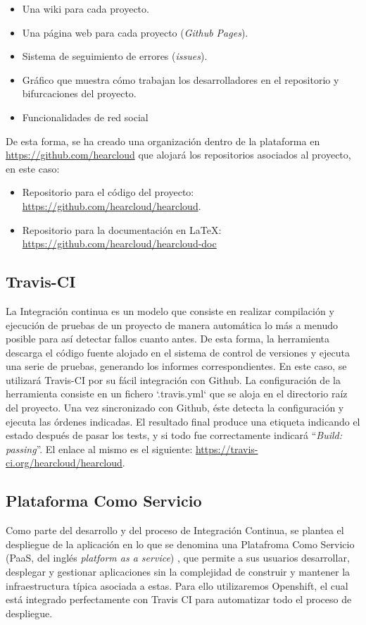 \begin{itemize}
	\item Una wiki para cada proyecto.
	\item Una página web para cada proyecto (\textit{Github Pages}).
	\item Sistema de seguimiento de errores (\textit{issues}).
	\item Gráfico que muestra cómo trabajan los desarrolladores en el repositorio y bifurcaciones del proyecto.
	\item Funcionalidades de red social
\end{itemize}

De esta forma, se ha creado una organización dentro de la plataforma en \url{https://github.com/hearcloud} que alojará los repositorios asociados al proyecto, en este caso:

\begin{itemize}
	\item Repositorio para el código del proyecto: \url{https://github.com/hearcloud/hearcloud}.
	\item Repositorio para la documentación en {\LaTeX\xspace}: \url{https://github.com/hearcloud/hearcloud-doc}
\end{itemize}

\subsection{Travis-CI}
La Integración continua es un modelo que consiste en realizar compilación y ejecución de pruebas de un proyecto de manera automática lo más a menudo posible para así detectar fallos cuanto antes. De esta forma, la herramienta descarga el código fuente alojado en el sistema de control de versiones y ejecuta una serie de pruebas, generando los informes correspondientes. En este caso, se utilizará Travis-CI \cite{TravisCI} por su fácil integración con Github. La configuración de la herramienta consiste en un fichero `.travis.yml` que se aloja en el directorio raíz del proyecto. Una vez sincronizado con Github, éste detecta la configuración y ejecuta las órdenes indicadas. El resultado final produce una etiqueta indicando el estado después de pasar los tests, y si todo fue correctamente indicará ``\textit{Build: passing}''. El enlace al mismo es el siguiente: \url{https://travis-ci.org/hearcloud/hearcloud}.

\subsection{Plataforma Como Servicio}
Como parte del desarrollo y del proceso de Integración Continua, se plantea el despliegue de la aplicación en lo que se denomina una Platafroma Como Servicio (PaaS, del inglés \textit{platform as a service}) \cite{PaaS}, que permite a sus usuarios desarrollar, desplegar y gestionar aplicaciones sin la complejidad de construir y mantener la infraestructura típica asociada a estas. Para ello utilizaremos Openshift, el cual está integrado perfectamente con Travis CI para automatizar todo el proceso de despliegue. 

